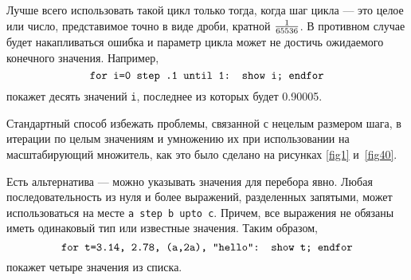\documentclass{article} %
\begin{document}
Лучше всего использовать такой цикл только тогда, когда шаг цикла --- 
это целое или число, представимое точно в виде дроби, кратной $1\over65536$. 
В противном случае будет накапливаться ошибка и параметр цикла может не 
достичь ожидаемого конечного значения.
Например, 
$$ \hbox{\tt for i=0 step .1 until 1: show i; endfor} $$
покажет десять значений {\tt i}, последнее из которых будет 0.90005.

Стандартный способ избежать проблемы, связанной с нецелым размером шага, 
в итерации по целым значениям и умножению их при использовании на 
масштабирующий множитель, как это было сделано на рисунках \ref{fig1} 
и~\ref{fig40}.

Есть альтернатива --- можно указывать значения для перебора явно. 
Любая последовательность из нуля и более выражений, разделенных запятыми, 
может использоваться на месте {\tt a step b upto c}. 
Причем, все выражения не обязаны иметь одинаковый тип или известные 
значения. 
Таким образом, 
$$ \hbox{\tt for t=3.14, 2.78, (a,2a), "hello": show t; endfor} $$
покажет четыре значения из списка.
\end{document}
